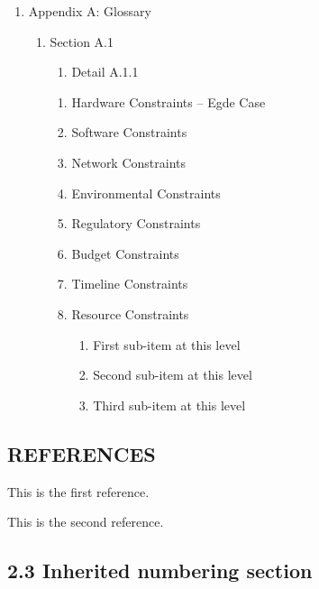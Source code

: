 \documentclass[11pt,a4paper]{article}
\begin{document}
\begin{enumerate}
\item Appendix A: Glossary
  \begin{enumerate}
\item Section A.1
    \begin{enumerate}
\item Detail A.1.1
    \end{enumerate}
    \begin{enumerate}
\item Hardware Constraints – Egde Case
\item Software Constraints
\item Network Constraints
\item Environmental Constraints
\item Regulatory Constraints
\item Budget Constraints
\item Timeline Constraints
\item Resource Constraints
      \begin{enumerate}
\item First sub-item at this level
\item Second sub-item at this level
\item Third sub-item at this level
      \end{enumerate}
    \end{enumerate}
  \end{enumerate}
\end{enumerate}

\subsection{REFERENCES}

This is the first reference.

This is the second reference.

\subsection{2.3 Inherited numbering section}
\end{document}
